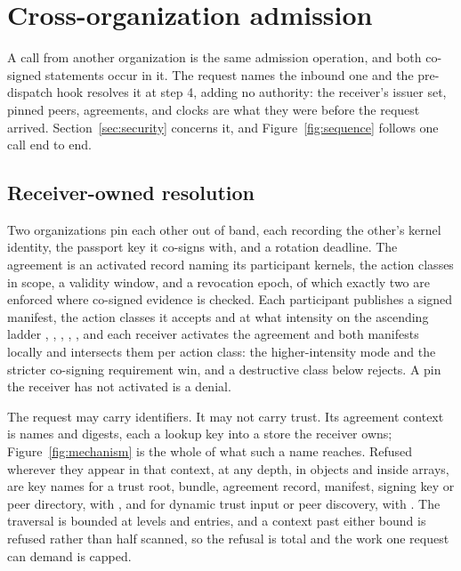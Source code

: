 \section{Cross-organization admission}
\label{sec:cross}

A call from another organization is the same admission operation, and both
co-signed statements occur in it. The request names the inbound one and the
pre-dispatch hook resolves it at step 4, adding no authority: the receiver's
issuer set, pinned peers, agreements, and clocks are what they were before the
request arrived. Section~\ref{sec:security} concerns it, and
Figure~\ref{fig:sequence} follows one call end to end.



\subsection{Receiver-owned resolution}

Two organizations pin each other out of band, each recording the other's
kernel identity, the passport key it co-signs with, and a rotation deadline.
The agreement is an activated record naming its participant kernels, the
action classes in scope, a validity window, and a revocation epoch, of which
exactly two are enforced where co-signed evidence is checked. Each participant publishes a
signed manifest, the action classes it accepts and at what intensity on the
ascending ladder , ,
, , , and
each receiver activates the agreement and both manifests locally and
intersects them per action class: the higher-intensity mode and the
stricter co-signing requirement win, and a destructive class below
 rejects. A pin the receiver has not activated is a
denial.

The request may carry identifiers. It may not carry trust. Its agreement
context is names and digests, each a lookup key into a store the receiver
owns; Figure~\ref{fig:mechanism} is the whole of what such a name reaches.
Refused wherever they appear in that context, at any depth, in objects and
inside arrays, are \PSTrustRootKeyCount{} key names for a trust root, bundle,
agreement record, manifest, signing key or peer directory, with
, and \PSDynamicTrustKeyCount{} for dynamic
trust input or peer discovery, with . The
traversal is bounded at \PSContextScanDepth{} levels and
\PSContextScanEntries{} entries, and a context past either bound is refused
rather than half scanned, so the refusal is total and the work one request can
demand is capped.

